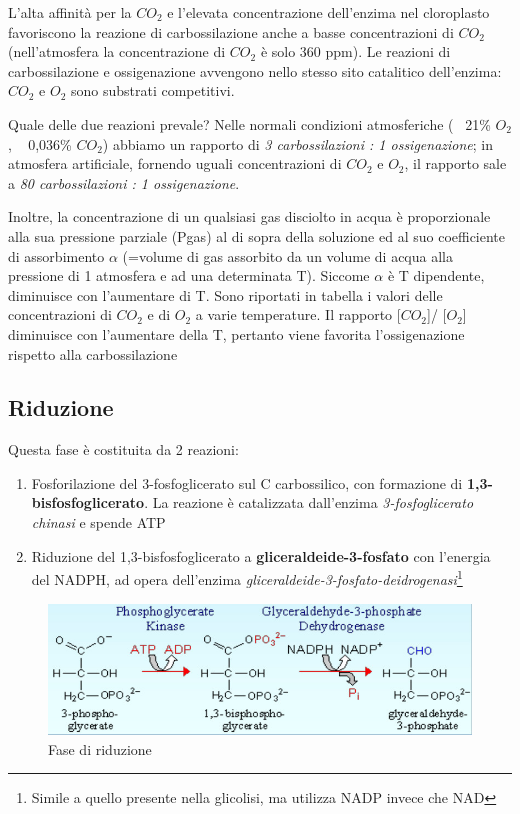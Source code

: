 \documentclass[a4paper,12pt]{book}
\begin{document}
L'alta affinità per la $CO_{2}$ e l'elevata concentrazione dell'enzima nel cloroplasto favoriscono la reazione di
carbossilazione anche a basse concentrazioni di $CO_{2}$ (nell'atmosfera la concentrazione di $CO_{2}$ è solo 360 ppm).
Le reazioni di carbossilazione e ossigenazione avvengono nello stesso sito catalitico dell'enzima: $CO_{2}$ e
$O_{2}$ sono substrati competitivi. 

Quale delle due reazioni prevale? Nelle normali condizioni atmosferiche (~ 21\% $O_{2}$, ~ 0,036\% $CO_{2}$) abbiamo un rapporto di \emph{3 carbossilazioni : 1 ossigenazione}; in atmosfera artificiale, fornendo uguali concentrazioni di $CO_{2}$ e $O_{2}$, il rapporto sale a \emph{80 carbossilazioni : 1 ossigenazione}.

Inoltre, la concentrazione di un qualsiasi gas disciolto in acqua è proporzionale alla sua pressione parziale
(Pgas) al di sopra della soluzione ed al suo coefficiente di assorbimento $\alpha$ (=volume di gas assorbito da
un volume di acqua alla pressione di 1 atmosfera e ad una determinata T). Siccome $\alpha$ è T dipendente,
diminuisce con l’aumentare di T. Sono riportati in tabella i valori delle concentrazioni di $CO_{2}$ e di $O_{2}$ a varie
temperature. Il rapporto [$CO_{2}$]/ [$O_{2}$] diminuisce con l’aumentare della T, pertanto viene favorita l'ossigenazione rispetto alla carbossilazione

\subsection{Riduzione}
Questa fase è costituita da 2 reazioni:
\begin{enumerate}
\item{Fosforilazione del 3-fosfoglicerato sul C carbossilico, con formazione di \textbf{1,3-bisfosfoglicerato}. La reazione è catalizzata dall'enzima \emph{3-fosfoglicerato chinasi} e spende ATP}
\item{Riduzione del 1,3-bisfosfoglicerato a \textbf{gliceraldeide-3-fosfato} con l'energia del NADPH, ad opera dell'enzima \emph{gliceraldeide-3-fosfato-deidrogenasi}\footnote{Simile a quello presente nella glicolisi, ma utilizza NADP invece che NAD}}
\end{enumerate}
\begin{figure}[H]
\centering
\includegraphics[scale=0.4]{immagini/riduzione.jpg}
\caption{Fase di riduzione}
\end{figure}
\end{document}
